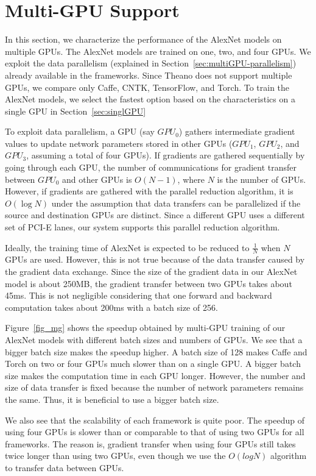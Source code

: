 \section{Multi-GPU Support}
\label{multi-GPU}
In this section, we characterize the performance of the AlexNet models on multiple GPUs. The AlexNet models are trained on one, two, and four GPUs. We exploit the data parallelism (explained in Section~\ref{sec:multiGPU-parallelism}) already available in the frameworks. Since Theano does not support multiple GPUs, we compare only Caffe, CNTK, TensorFlow, and Torch. To train the AlexNet models, we select the fastest option based on the characteristics on a single GPU in Section~\ref{sec:singlGPU}

To exploit data parallelism, a GPU (say $GPU_0$) gathers intermediate gradient values to update network parameters stored in other GPUs ($GPU_1$, $GPU_2$, and $GPU_3$, assuming a total of four GPUs). If gradients are gathered sequentially by going through each GPU, the number of communications for gradient transfer between $GPU_0$ and other GPUs is $O(N-1)$, where $N$ is the number of GPUs. However, if gradients are gathered with the parallel reduction algorithm\cite{harris2007optimizing}, it is $O(\log{N})$ under the assumption that data transfers can be parallelized if the source and destination GPUs are distinct. Since a different GPU uses a different set of PCI-E lanes, our system supports this parallel reduction algorithm.

Ideally, the training time of AlexNet is expected to be reduced to $\frac{1}{N}$ when $N$ GPUs are used. However, this is not true because of the data transfer caused by the gradient data exchange. Since the size of the gradient data in our AlexNet model is about 250MB, the gradient transfer between two GPUs takes about 45ms. This is not negligible considering that one forward and backward computation takes about 200ms with a batch size of 256.

Figure~\ref{fig_mg} shows the speedup obtained by multi-GPU training of our AlexNet models with different batch sizes and numbers of GPUs. We see that a bigger batch size makes the speedup higher. A batch size of 128 makes Caffe and Torch on two or four GPUs much slower than on a single GPU. A bigger batch size makes the computation time in each GPU longer. However, the number and size of data transfer is fixed because the number of network parameters remains the same. Thus, it is beneficial to use a bigger batch size.

We also see that the scalability of each framework is quite poor. The speedup of using four GPUs is slower than or comparable to that of using two GPUs for all frameworks. The reason is, gradient transfer when using four GPUs still takes twice longer than using two GPUs, even though we use the $O(log N)$ algorithm to transfer data between GPUs.

